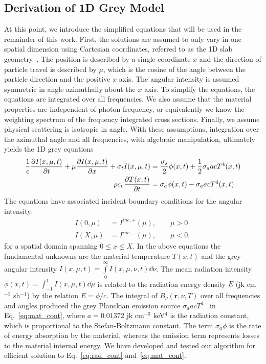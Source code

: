 \subsection{Derivation of 1D Grey Model}

At this point, we introduce the simplified equations that will be used in the remainder of
this work.  First, the solutions are assumed to only vary in one spatial dimension using
Cartesian coordinates, referred to as the 1D slab geometry~\cite{lewis}.   The
position is described by a single coordinate $x$ and the direction of particle travel
is described by $\mu$, which is the cosine of the angle between the particle direction and the
positive $x$ axis. The angular
intensity is assumed symmetric in angle azimuthally about the $x$ axis.  
To
simplify the equations, the equations are integrated over all frequencies.  We also assume that the material properties are independent of photon frequency, or
equivalently we know the weighting spectrum of the frequency integrated cross sections.   Finally, we assume physical scattering
is isotropic in angle. With these assumptions, integration over the azimuthal angle and
all frequencies, with algebraic manipulation, ultimately yields the 1D grey equations~\cite{wollaber_thesis,mihalas}
\begin{align}\label{eq:rad_cont}
    \frac{1}{c}\frac{\partial I(x,\mu,t)}{\partial t} + \mu \frac{\partial I(x,\mu,t)}{\partial x} + \sigma_t
    I(x,\mu,t)
&= \frac{\sigma_s}{2} \phi(x,t) +\frac{1}{2} \sigma_a a c T^4(x,t)
    \\ \label{eq:mat_cont}
  \rho c_v \frac{\partial T(x,t)}{\partial t} &=  \sigma_a \phi(x,t) - \sigma_a a c T^4(x,t).
\end{align}
The equations have associated incident boundary conditions for the angular intensity:
\begin{align}
    I(0,\mu) &= I^{inc,+}(\mu),\quad\quad \mu>0 \\
    I(X,\mu) &= I^{inc,-}(\mu), \quad\quad \mu<0,
\end{align}
for a spatial domain spanning $0\leq x \leq X$.
In the above equations the fundamental unknowns are the material temperature $T(x,t)$ and
the grey angular intensity $I(x,\mu,t)=\int\limits_0^\infty I(x,\mu,\nu,t) \dd \nu$. The mean radiation intensity $\phi(x,t)=\int_{-1}^1
I(x,\mu,t) \dd \mu$ is related to the radiation energy density
$E$ (jk cm$^{-3}$ sh$^{-1}$) by the relation $E = \phi/c$.  The integral of
$B_\nu(\mathbf{r},\nu,T)$ over all frequencies and angles produced the 
grey Planckian emission source $\sigma_a a c T^4$~\cite{mihalas} in
Eq.~\eqref{eq:mat_cont}, where $a=0.01372$ jk cm$^{-3}$
keV$^{4}$ is the radiation constant, which is proportional to the Stefan-Boltzmann
constant.  The term $\sigma_a \phi$ is the rate of energy absorption by the material,
whereas the emission term represents losses to the material internal energy.  We have developed
and tested our algorithm for efficient solution to Eq.~\eqref{eq:rad_cont}
and~\eqref{eq:mat_cont}.

